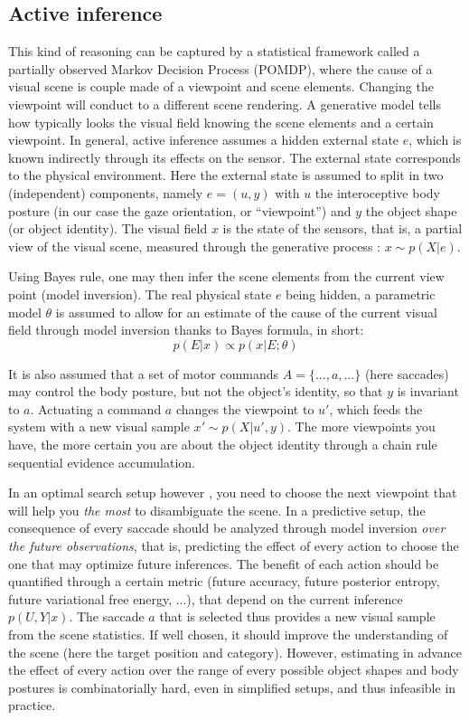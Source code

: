 \subsection*{Active inference}


This kind of reasoning can be captured by a statistical framework called a
partially observed Markov Decision Process (POMDP), where the cause of a visual scene is couple made of
a viewpoint and scene elements. Changing the viewpoint will conduct to a different scene rendering.
A generative model tells how typically looks the visual field knowing the scene elements and a certain viewpoint. 
In general, active inference assumes a hidden external state $e$, which is known indirectly through its effects on the sensor. The external state corresponds to the physical environment. Here the external state is assumed to split in two (independent) components, namely $e = (u,y)$ with $u$ the interoceptive body posture (in our case the gaze orientation, or ``viewpoint'') and $y$ the object shape (or object identity). The visual field $x$ is the state of the sensors, that is, a partial view of the visual scene, measured through the generative process : $x\sim p(X|e)$. 


Using Bayes rule, one may then infer the scene elements from the current view point (model inversion).
 The real physical state $e$ being hidden, a parametric model $\theta$ is assumed to allow for an estimate of the cause of the current visual field through model inversion thanks to Bayes formula, in short:
$$p(E|x) \propto p(x|E;\theta)$$


It is also assumed that a set of motor commands $A = \{..., a, ...\}$ (here saccades) may control the body posture, but not the object's identity, so that $y$ is invariant to $a$. Actuating a command $a$ changes the viewpoint to $u'$, which feeds the system with a new visual sample $x'\sim p(X|u', y)$. The more viewpoints you have, the more certain you are about the object identity through a chain rule sequential evidence accumulation. 

In an optimal search setup however \cite{Najemnik05}, you need to choose the next viewpoint that will help you \emph{the most} to disambiguate the scene.
In a predictive setup, the consequence of every saccade should be analyzed through model inversion \emph{over the future observations}, that is, predicting the effect of every action to choose the one that may optimize future inferences. The benefit of each action should be quantified through a certain metric (future accuracy, future posterior entropy, future variational free energy, ...), that depend on the current inference $p(U,Y|x)$. The saccade $a$ that is selected thus provides a new visual sample from the scene statistics. If well chosen, it should improve the understanding of the scene (here the target position and category). However, estimating in advance the effect of every action over the range of every possible object shapes and body postures is combinatorially hard, even in simplified setups, and thus infeasible in practice.

